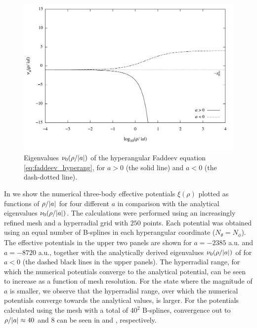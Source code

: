\begin{figure}[htbp!]
	\includegraphics[width=\linewidth]{faddeev.pdf}
	\caption{Eigenvalues $\nu_0(\rho/\lvert a\rvert)$ of the hyperangular Faddeev equation \eqref{eq:faddeev_hyperang}, for $a>0$ (the solid line) and $a<0$ (the dash-dotted line).}
	\label{fig:faddeev}
\end{figure}

In  we show the numerical three-body effective potentials $\xi(\rho)$ plotted as functions of $\rho/\lvert a\rvert$ for four different $a$ in comparison with the analytical eigenvalues $\nu_0(\rho/\lvert a\rvert)$. The calculations were performed using an increasingly refined mesh and a hyperradial grid with $250$ points. Each potential was obtained using an equal number of B-splines in each hyperangular coordinate ($N_{\theta} = N_{\phi}$). The effective potentials in the upper two panels are shown for  $a=-2385$ a.u. and  $a=-8720$ a.u., together with the analytically derived eigenvalues $\nu_0(\rho/\lvert a\rvert)$ of  for $a<0$ (the dashed black lines in the upper panels). The hyperradial range, for which the numerical potentials converge to the analytical potential, can be seen to increase as a function of mesh resolution. For the state where the magnitude of $a$ is smaller, we observe that the hyperradial range, over which the numerical potentials converge towards the analytical values, is larger. For the potentials calculated using the mesh with a total of $40^2$ B-splines, convergence out to $\rho/\lvert a\rvert \approx 40$ and $8$ can be seen in  and , respectively.  

